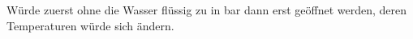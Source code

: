 Würde zuerst ohne die Wasser flüssig zu in bar dann erst geöffnet werden, deren Temperaturen würde sich ändern.